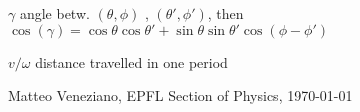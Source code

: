 \begin{squishlist}
\item $\gamma$ angle betw.  $(\theta, \phi)$ , $(\theta', \phi')$, then  $\cos(\gamma) = \cos\theta \cos\theta' + \sin\theta \sin\theta' \cos(\phi - \phi')$
\item $v/\omega$ distance travelled in one period
\end{squishlist}

\vfill 
Matteo Veneziano, EPFL Section of Physics, \today